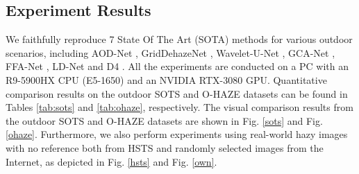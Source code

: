 \documentclass[lettersize,journal]{IEEEtran}
\begin{document}

\subsection{Experiment Results}
We faithfully reproduce 7 State Of The Art (SOTA) methods for various outdoor scenarios, including AOD-Net \cite{li2017aod}, GridDehazeNet \cite{liu2019griddehazenet}, Wavelet-U-Net \cite{yang2019wavelet}, GCA-Net \cite{chen2019gated}, FFA-Net \cite{qin2020ffa}, LD-Net 
\cite{ullah2021light} and D4 \cite{yang2022d4}. All the experiments are conducted on a PC with an R9-5900HX CPU (E5-1650) and an NVIDIA RTX-3080 GPU. Quantitative comparison results on the outdoor SOTS and O-HAZE datasets can be found in Tables \ref{tab:sots} and \ref{tab:ohaze}, respectively. The visual comparison results from the outdoor SOTS and O-HAZE datasets are shown in Fig. \ref{sots} and Fig. \ref{ohaze}. Furthermore, we also perform experiments using real-world hazy images with no reference both from HSTS and randomly selected images from the Internet, as depicted in Fig. \ref{hsts} and Fig. \ref{own}. 
\end{document}

